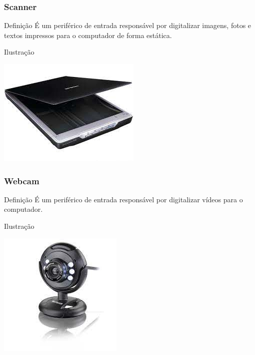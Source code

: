 \documentclass[aspectratio=169]{beamer} %
\begin{document}
\begin{frame}
	\frametitle{Scanner}
	
	\begin{block}{Defini\c cão}
		É um periférico de entrada responsável por digitalizar imagens, fotos e textos impressos para o computador de forma estática.
	\end{block}\vfill
	
	\begin{exampleblock}{Ilustra\c cão}
		\begin{center}
			\includegraphics[scale=0.4]{img/scanner}
		\end{center}				
	\end{exampleblock}
\end{frame}

\begin{frame}
	\frametitle{Webcam}
	
	\begin{block}{Defini\c cão}
		É um periférico de entrada responsável por digitalizar vídeos para o computador.
	\end{block}\vfill
	
	\begin{exampleblock}{Ilustra\c cão}
		\begin{center}
			\includegraphics[scale=0.4]{img/webcam}
		\end{center}				
	\end{exampleblock}
\end{frame}
\end{document}
